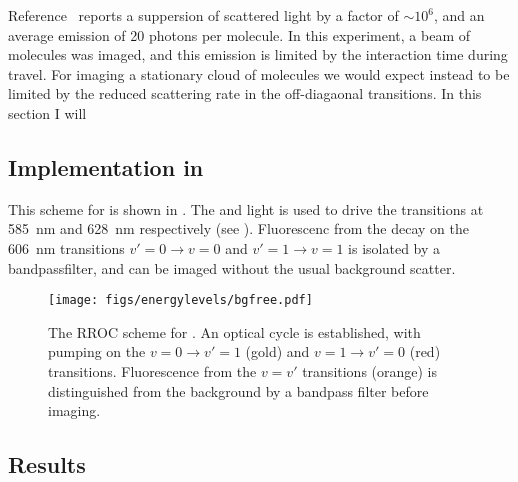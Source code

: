 Reference~\cite{Shaw2021} reports a suppersion of scattered light by a factor
of $\sim10^6$, and an average emission of 20 photons per molecule. In this
experiment, a beam of molecules was imaged, and this emission is limited by the
interaction time during travel. For imaging a stationary cloud of molecules we
would expect instead to be limited by the reduced scattering rate in the
off-diagaonal transitions. In this section I will 

\subsection{Implementation in \CaF{}}


This scheme for \CaF{} is shown in . The
 and  light is used to drive the transitions at
\SI{585}{\nano\meter} and \SI{628}{\nano\meter} respectively (see
). Fluorescenc from the decay on the
\SI{606}{\nano\meter} transitions $v'=0\rightarrow v=0$ and $v'=1\rightarrow
v=1$ is isolated by a bandpassfilter, and can be imaged without the usual
background scatter.

\begin{figure}
  \centering
  \texttt{[image: figs/energylevels/bgfree.pdf]}
  \caption{
  The RROC scheme for \CaF{}. An optical cycle is established, with pumping on
  the $v=0 \rightarrow v'=1$ (gold) and $v=1 \rightarrow v'=0$ (red) transitions.
  Fluorescence from the $v=v'$ transitions (orange) is distinguished from the
  background by a bandpass filter before imaging.
  }
  \label{exper:fig:bgfreelevels}
\end{figure}

\subsection{Results}

